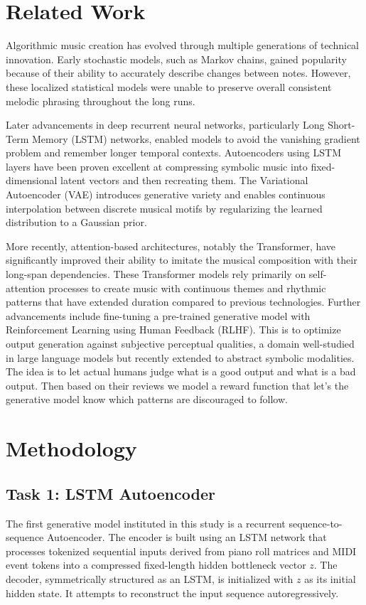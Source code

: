 \documentclass[conference]{IEEEtran}
\begin{document}
\section{Related Work}
Algorithmic music creation has evolved through multiple generations of technical innovation. Early stochastic models, such as Markov chains, gained popularity because of their ability to accurately describe changes between notes. However, these localized statistical models were unable to preserve overall consistent melodic phrasing throughout the long runs.

Later advancements in deep recurrent neural networks, particularly Long Short-Term Memory (LSTM) networks, enabled models to avoid the vanishing gradient problem and remember longer temporal contexts. Autoencoders using LSTM layers have been proven excellent at compressing symbolic music into fixed-dimensional latent vectors and then recreating them. The Variational Autoencoder (VAE) introduces generative variety and enables continuous interpolation between discrete musical motifs by regularizing the learned distribution to a Gaussian prior.

More recently, attention-based architectures, notably the Transformer, have significantly improved their ability to imitate the musical composition with their long-span dependencies. These Transformer models rely primarily on self-attention processes to create music with continuous themes and rhythmic patterns that have extended duration compared to previous technologies. Further advancements include fine-tuning a pre-trained generative model with Reinforcement Learning using Human Feedback (RLHF). This is to optimize output generation against subjective perceptual qualities, a domain well-studied in large language models but recently extended to abstract symbolic modalities. The idea is to let actual humans judge what is a good output and what is a bad output. Then based on their reviews we model a reward function that let's the generative model know which patterns are discouraged to follow.
\section{Methodology}

\subsection{Task 1: LSTM Autoencoder}
The first generative model instituted in this study is a recurrent sequence-to-sequence Autoencoder. The encoder is built using an LSTM network that processes tokenized sequential inputs derived from piano roll matrices and MIDI event tokens into a compressed fixed-length hidden bottleneck vector $z$. The decoder, symmetrically structured as an LSTM, is initialized with $z$ as its initial hidden state. It attempts to reconstruct the input sequence autoregressively.
\end{document}

